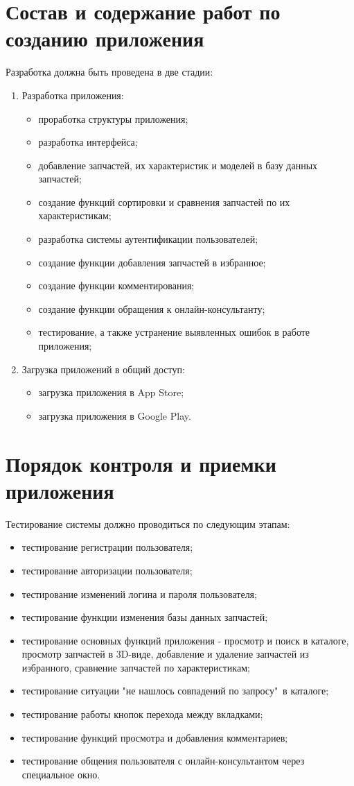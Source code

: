 \documentclass[14pt]{extreport}
\begin{document}
\newpage
\section{Состав и содержание работ по созданию приложения}
Разработка должна быть проведена в две стадии:
\begin{enumerate}
	\item Разработка приложения:
	\begin{itemize}
		\item проработка структуры приложения;
		\item разработка интерфейса;
		\item добавление запчастей, их характеристик и моделей в базу данных запчастей;
		\item создание функций сортировки и сравнения запчастей по их характеристикам;
		\item разработка системы аутентификации пользователей;
		\item создание функции добавления запчастей в избранное;
		\item создание функции комментирования;
		\item создание функции обращения к онлайн-консультанту;
		\item тестирование, а также устранение выявленных ошибок в работе приложения;
	\end{itemize}
	\item Загрузка приложений в общий доступ:
	\begin{itemize}
		\item загрузка приложения в App Store;
		\item загрузка приложения в Google Play.
	\end{itemize}
\end{enumerate} 

\newpage
\section{Порядок контроля и приемки приложения}

Тестирование системы должно проводиться по следующим этапам:
\begin{itemize}
	\item тестирование регистрации пользователя;
	\item тестирование авторизации пользователя;
	\item тестирование изменений логина и пароля пользователя;
	\item тестирование функции изменения базы данных запчастей;
	\item тестирование основных функций приложения - просмотр и поиск в каталоге, просмотр запчастей в 3D-виде, добавление и удаление запчастей из избранного, сравнение запчастей по характеристикам;
	\item тестирование ситуации "не нашлось совпадений по запросу"\ в каталоге;
	\item тестирование работы кнопок перехода между вкладками;
	\item тестирование функций просмотра и добавления комментариев;
	\item тестирование общения пользователя с онлайн-консультантом через специальное окно.
\end{itemize}
\end{document}
